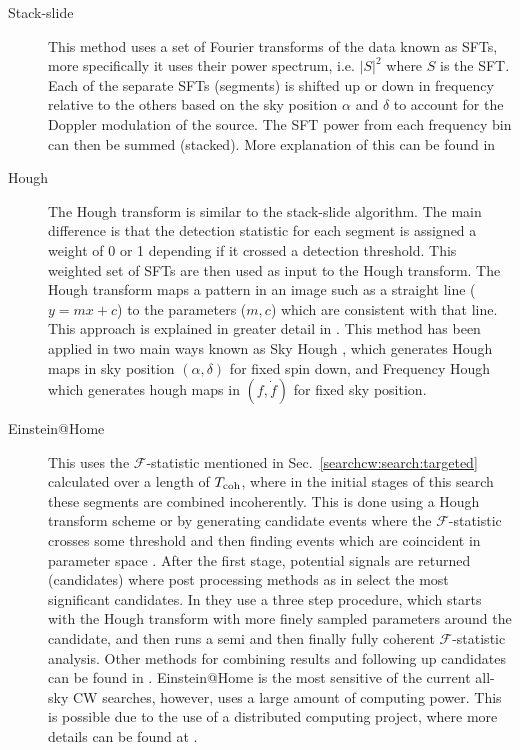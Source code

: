\begin{description}
	
        \item[Stack-slide] This method uses a set of Fourier
transforms of the data known as \glspl{SFT}, more specifically it uses their power
spectrum, i.e. $|S|^2$ where $S$ is the \gls{SFT}. Each of the separate
\glspl{SFT} (segments) is shifted up or down in frequency relative
to the others based on the sky position $\alpha$ and $\delta$ to account for the Doppler modulation of the source. The \gls{SFT}
power from each frequency bin can then be summed (stacked). More explanation of this can be found in
\citep{brady2000SearchingPeriodic, cutler2005ImprovedStackslide}  
	
        \item[Hough] The Hough transform is similar to the stack-slide algorithm.
The main difference is that the detection statistic for each segment is
assigned a weight of 0 or 1 depending if it crossed a detection threshold. This weighted set of \glspl{SFT} are then used as input to the Hough transform.
The Hough transform maps a pattern in an image such as a straight line ($y=mx + c$) to the parameters ($m,c$) which are consistent with that line.
This approach is explained in greater detail in
\citep{krishnan2004HoughTransform,antonucci2008DetectionPeriodic}.  This method
has been applied in two main ways known as Sky Hough
\citep{krishnan2004HoughTransform}, which generates Hough maps in sky position $(\alpha,\delta)$ for fixed spin down, and Frequency Hough
\citep{antonucci2008DetectionPeriodic,astone2014MethodAllsky} which generates hough maps in $(f,\dot{f})$ for fixed sky position.
	
        \item[Einstein@Home] This uses the
$\mathcal{F}$-statistic mentioned in Sec.~\ref{searchcw:search:targeted} calculated over a length of $T_{\rm{coh}}$, where in the initial stages of this search these segments are combined incoherently. This is done using a Hough transform scheme \citep{theligoscientificcollaborationandthevirgocollaboration2013EinsteinHome} or by generating candidate events where the $\mathcal{F}$-statistic crosses some threshold and then finding events which are coincident in parameter space \citep{ligoscientificcollaboration2009EinsteinHome}.
After the first stage, potential signals are returned (candidates) where post processing methods as in \citep{theligoscientificcollaborationandthevirgocollaboration2013EinsteinHome} select the most significant candidates.
In \citep{theligoscientificcollaborationandthevirgocollaboration2013EinsteinHome} they use a three step procedure, which starts with the Hough transform with more finely sampled parameters around the candidate, and then runs a semi and then finally fully coherent $\mathcal{F}$-statistic analysis.
Other methods for combining results and following up candidates can be found in \citep{singh2016ResultsAllsky,papa2016HierarchicalFollowup,walsh2016ComparisonMethods}.
Einstein@Home is the most sensitive of the current all-sky \gls{CW} searches,
however, uses a large amount of computing power. This is possible due to the use of a
distributed computing project, where more details can be found at
\citep{EinsteinHome}. 
	

\end{description}
